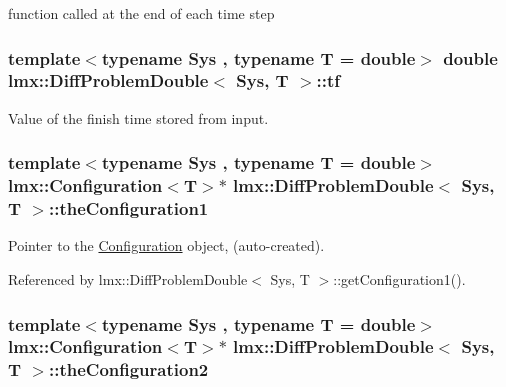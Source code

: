 function called at the end of each time step 

\hypertarget{classlmx_1_1DiffProblemDouble_a48be1fc2aba0df868106372d5e31e2ad}{
\subsubsection[{tf}]{\setlength{\rightskip}{0pt plus 5cm}template$<$typename Sys , typename T  = double$>$ double {\bf lmx\-::\-Diff\-Problem\-Double}$<$ Sys, T $>$\-::tf\hspace{0.3cm}{\ttfamily [protected]}}}\label{classlmx_1_1DiffProblemDouble_a48be1fc2aba0df868106372d5e31e2ad}


Value of the finish time stored from input. 

\hypertarget{classlmx_1_1DiffProblemDouble_ae53777e808b169b5d9974e4e1b5ae88c}{
\subsubsection[{the\-Configuration1}]{\setlength{\rightskip}{0pt plus 5cm}template$<$typename Sys , typename T  = double$>$ {\bf lmx\-::\-Configuration}$<$T$>$$\ast$ {\bf lmx\-::\-Diff\-Problem\-Double}$<$ Sys, T $>$\-::the\-Configuration1\hspace{0.3cm}{\ttfamily [protected]}}}\label{classlmx_1_1DiffProblemDouble_ae53777e808b169b5d9974e4e1b5ae88c}


Pointer to the \hyperlink{classlmx_1_1Configuration}{Configuration} object, (auto-\/created). 



Referenced by lmx\-::\-Diff\-Problem\-Double$<$ Sys, T $>$\-::get\-Configuration1().

\hypertarget{classlmx_1_1DiffProblemDouble_ac19d79f3e7b88a12467a7822e33ca7ab}{
\subsubsection[{the\-Configuration2}]{\setlength{\rightskip}{0pt plus 5cm}template$<$typename Sys , typename T  = double$>$ {\bf lmx\-::\-Configuration}$<$T$>$$\ast$ {\bf lmx\-::\-Diff\-Problem\-Double}$<$ Sys, T $>$\-::the\-Configuration2\hspace{0.3cm}{\ttfamily [protected]}}}\label{classlmx_1_1DiffProblemDouble_ac19d79f3e7b88a12467a7822e33ca7ab}


